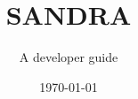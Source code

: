 \documentclass[a4paper,10pt,twoside]{report}
\begin{document}
\pagestyle{fancy} 

\title{SANDRA}
\author{A developer guide}
\date{\today}

\maketitle

\tableofcontents


\end{document}
